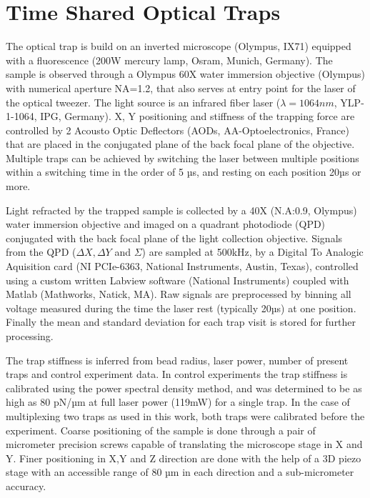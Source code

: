 \documentclass[A4paperpaper,11pt,english]{sphinxmanual}
\begin{document}
\section{Time Shared Optical Traps}
\label{index-latex:time-shared-optical-traps}\label{index-latex:time-shared-ot}
The optical trap is build on an inverted microscope (Olympus, IX71) equipped with
a fluorescence (200W mercury lamp, Osram, Munich, Germany). The sample is observed
through a Olympus 60X water immersion objective (Olympus) with numerical aperture NA=1.2, that also
serves at entry point for the laser of the optical tweezer.  The light source is
an infrared fiber laser (\(\lambda=1064nm\), YLP-1-1064, IPG,
Germany). X, Y positioning and stiffness of the trapping force are controlled
by 2 Acousto Optic Deflectors (AODs, AA-Optoelectronics, France) that are placed  in the conjugated plane of
the back focal plane of the objective.
Multiple traps can be achieved by switching the laser between
multiple positions within a switching time in the order of 5 µs, and resting
on each position 20µs or more.

Light refracted by the trapped sample is collected by a 40X (N.A:0.9, Olympus)
water immersion objective and imaged on a quadrant photodiode (QPD) conjugated
with the back focal plane of the light collection objective. Signals from the
QPD (\(\Delta X, \Delta Y\) and \(\Sigma\)) are sampled at 500kHz, by a Digital
To Analogic Aquisition card (NI PCIe-6363, National Instruments, Austin,
Texas), controlled using a custom written Labview software (National Instruments)
coupled with Matlab (Mathworks, Natick, MA). Raw signals are preprocessed by binning all
voltage measured during the time the laser rest (typically 20µs) at one position. Finally
the mean and standard deviation for each trap visit is stored for further processing.

The trap stiffness is inferred from bead radius, laser power, number of present
traps and control experiment data. In control experiments the trap stiffness is
calibrated using the power spectral density method, and was determined
to be as high as 80 pN/µm at full laser power (119mW) for a single trap.
In the case of multiplexing two traps as used in this work, both traps were calibrated before
the experiment.
Coarse positioning of the sample is done through a pair of micrometer precision
screws capable of translating the microscope stage in X and Y.  Finer
positioning in X,Y and Z direction are done with the help of a 3D piezo stage with an
accessible range of 80 µm in each direction and a sub-micrometer accuracy.
\end{document}
